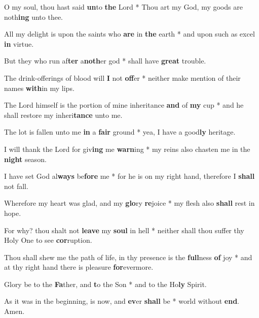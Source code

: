 \begin{multicols}{2}
	O my soul, thou hast said \textbf{un}to \textbf{the} Lord * Thou art my God, my goods are noth\textbf{ing} unto thee.
	
	All my delight is upon the saints who \textbf{are} in \textbf{the} earth * and upon such as excel \textbf{in} virtue.
	
	But they who run af\textbf{ter} a\textbf{noth}er god * shall have \textbf{great} trouble.
	
	The drink-offerings of blood will \textbf{I} not \textbf{off}er * neither make mention of their names \textbf{with}in my lips.
	
	The Lord himself is the portion of mine inheritance \textbf{and} of \textbf{my} cup * and he shall restore my inheri\textbf{tance} unto me.
	
	The lot is fallen unto me \textbf{in} a \textbf{fair} ground * yea, I have a good\textbf{ly} heritage.
	
	I will thank the Lord for giv\textbf{ing} me \textbf{warn}ing * my reins also chasten me in the \textbf{night} season.
	
	I have set God al\textbf{ways} be\textbf{fore} me * for he is on my right hand, therefore I \textbf{shall} not fall.
	
	Wherefore my heart was glad, and my \textbf{glo}ry \textbf{re}joice * my flesh also \textbf{shall} rest in hope.
	
	For why? thou shalt not \textbf{leave} my \textbf{soul} in hell * neither shall thou suffer thy Holy One to see \textbf{cor}ruption.
	
	Thou shall shew me the path of life, in thy presence is the \textbf{full}ness \textbf{of} joy * and at thy right hand there is pleasure \textbf{for}evermore.
	
	Glory be to the \textbf{Fa}ther, and \textbf{t}o the Son * and to the Ho\textbf{ly} Spirit.
	
	As it was in the beginning, is now, and \textbf{ev}er \textbf{shall} be * world without \textbf{end}. Amen.
\end{multicols}